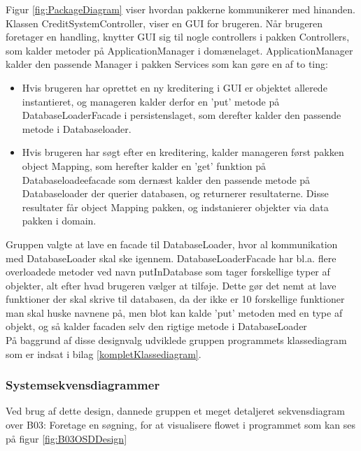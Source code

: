 Figur \ref{fig:PackageDiagram} viser hvordan pakkerne kommunikerer med hinanden.
Klassen CreditSystemController, viser en GUI for brugeren. Når brugeren
foretager en handling, knytter GUI sig til nogle controllers i pakken
Controllers, som kalder metoder på ApplicationManager i domænelaget.
ApplicationManager kalder den passende Manager i pakken Services som kan gøre en
af to ting: 

\begin{itemize}
    \item Hvis brugeren har oprettet en ny kreditering i GUI er objektet
        allerede instantieret, og manageren kalder derfor en 'put' metode på
        DatabaseLoaderFacade i persistenslaget, som derefter kalder den passende
        metode i Databaseloader. 
    \item Hvis brugeren har søgt efter en kreditering, kalder manageren først
        pakken object Mapping, som herefter kalder en 'get' funktion på
        Databaseloadeefacade som dernæst kalder den passende metode på
        Databaseloader der querier databasen, og returnerer resultaterne. Disse
        resultater får object Mapping pakken, og indstanierer objekter via data
        pakken i domain.
\end{itemize}

Gruppen valgte at lave en facade til DatabaseLoader, hvor al kommunikation med
DatabaseLoader skal ske igennem. DatabaseLoaderFacade har bl.a. flere
overloadede metoder ved navn putInDatabase som tager forskellige typer af
objekter, alt efter hvad brugeren vælger at tilføje. Dette gør det nemt at lave
funktioner der skal skrive til databasen, da der ikke er 10 forskellige
funktioner man skal huske navnene på, men blot kan kalde 'put' metoden med en
type af objekt, og så kalder facaden selv den rigtige metode i DatabaseLoader
\\
På baggrund af disse designvalg udviklede gruppen programmets klassediagram som
er indsat i bilag \ref{kompletKlassediagram}. 

\subsubsection{Systemsekvensdiagrammer}%
\label{ssub:systemsekvensdiagrammer}
Ved brug af dette design, dannede gruppen et meget detaljeret sekvensdiagram over B03: Foretage en søgning, for at visualisere flowet i programmet som kan ses på figur \ref{fig:B03OSDDesign}

